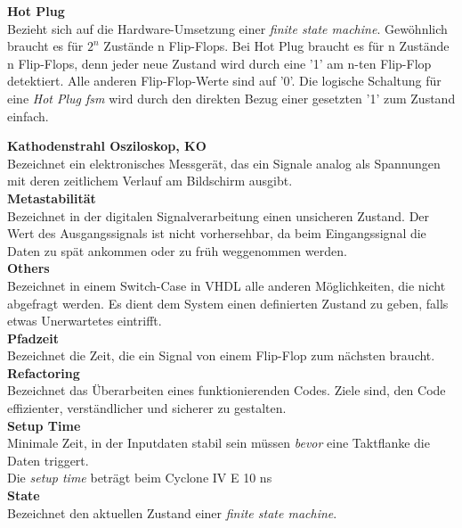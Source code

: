 \textbf{Hot Plug}\\
Bezieht sich auf die Hardware-Umsetzung einer \textit{finite state machine}. Gewöhnlich braucht es für \begin{math} 2^n \end{math} Zustände n Flip-Flops. Bei Hot Plug braucht es für n Zustände n Flip-Flops, denn jeder neue Zustand wird durch eine '1' am n-ten Flip-Flop detektiert. Alle anderen Flip-Flop-Werte sind auf '0'. Die logische Schaltung für eine \textit{Hot Plug fsm} wird durch den direkten Bezug einer gesetzten '1' zum Zustand einfach.


\textbf{Kathodenstrahl Osziloskop, KO}\\
Bezeichnet ein elektronisches Messgerät, das ein Signale analog als Spannungen mit deren zeitlichem Verlauf am Bildschirm ausgibt.\\

\textbf{Metastabilität}\\
Bezeichnet in der  digitalen Signalverarbeitung einen unsicheren Zustand. Der Wert des Ausgangssignals ist nicht vorhersehbar, da beim Eingangssignal die Daten zu spät ankommen oder zu früh weggenommen werden.\\

\textbf{Others}\\
Bezeichnet in einem Switch-Case in VHDL alle anderen Möglichkeiten, die nicht abgefragt werden. Es dient dem System einen definierten Zustand zu geben, falls etwas Unerwartetes eintrifft.\\

\textbf{Pfadzeit}\\
Bezeichnet die Zeit, die ein Signal von einem Flip-Flop zum nächsten braucht.\\

\textbf{Refactoring}\\
Bezeichnet das Überarbeiten eines funktionierenden Codes. Ziele sind, den Code effizienter, verständlicher und sicherer zu gestalten.\\


\textbf{Setup Time} \\
Minimale Zeit, in der Inputdaten stabil sein müssen \textit{bevor} eine Taktflanke die Daten triggert.\\
Die \textit{setup time} beträgt beim Cyclone IV E 10 ns \cite{Handbook_Altera}\\

\textbf{State}\\
Bezeichnet den aktuellen Zustand einer \textit{finite state machine}. \\

